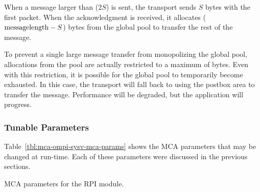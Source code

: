 When a message larger than ($2S$) is sent, the transport sends $S$
bytes with the first packet.  When the acknowledgment is received, it
allocates (${\rm message length} - S$) bytes from the global pool to
transfer the rest of the message.

To prevent a single large message transfer from monopolizing the
global pool, allocations from the pool are actually restricted to a
maximum of  bytes.  Even
with this restriction, it is possible for the global pool to
temporarily become exhausted.  In this case, the transport will fall
back to using the postbox area to transfer the message.  Performance
will be degraded, but the application will progress.


\subsubsection{Tunable Parameters}

Table~\ref{tbl:mca-ompi-sysv-mca-params} shows the MCA parameters that
may be changed at run-time.  Each of these parameters were discussed
in the previous sections.

\begin{table}[htbp]
  \begin{ssiparamtb}
%
%
%
%
%
%
%
  \end{ssiparamtb}
  \caption{MCA parameters for the  RPI module.}
  \label{tbl:mca-ompi-sysv-mca-params}
\end{table}

